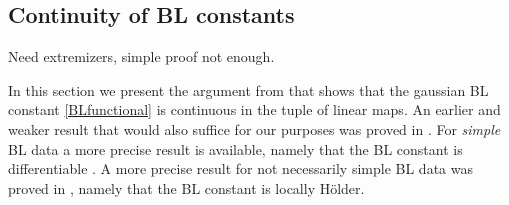 \documentclass[biblatex]{pzorin-note}
\begin{document}
\subsection{Continuity of BL constants}
Need extremizers, simple proof \cite{MR2661170} not enough.

In this section we present the argument from \cite{MR3723636} that shows that the gaussian BL constant \eqref{BLfunctional} is continuous in the tuple of linear maps.
An earlier and weaker result that would also suffice for our purposes was proved in \cite{MR3783217}.
For \emph{simple} BL data a more precise result is available, namely that the BL constant is differentiable \cite{MR2836590}.
A more precise result for not necessarily simple BL data was proved in \cite{arxiv:1811.11052}, namely that the BL constant is locally H\"older.
\end{document}
